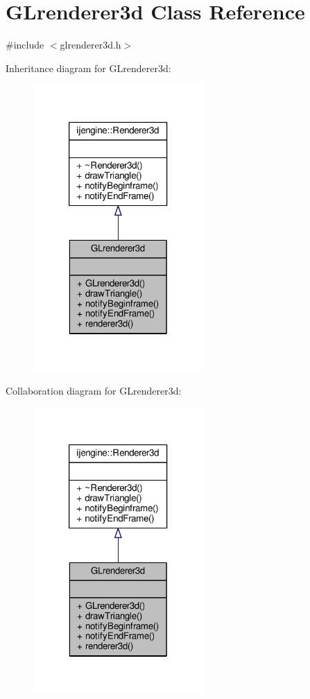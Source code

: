 \hypertarget{classGLrenderer3d}{\section{G\-Lrenderer3d Class Reference}
\label{classGLrenderer3d}
}


{\ttfamily \#include $<$glrenderer3d.\-h$>$}



Inheritance diagram for G\-Lrenderer3d\-:\nopagebreak
\begin{figure}[H]
\begin{center}
\leavevmode
\includegraphics[width=184pt]{classGLrenderer3d__inherit__graph}
\end{center}
\end{figure}


Collaboration diagram for G\-Lrenderer3d\-:\nopagebreak
\begin{figure}[H]
\begin{center}
\leavevmode
\includegraphics[width=184pt]{classGLrenderer3d__coll__graph}
\end{center}
\end{figure}
